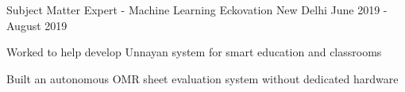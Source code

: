 

\begin{cventries}
\smallskip
  \cventry
    {Subject Matter Expert - Machine Learning} %
    {Eckovation} %
    {New Delhi} %
    {June 2019 - August 2019} %
    {
      \begin{cvitems} %
        \item {Worked to help develop Unnayan system for smart education and classrooms}
        \item {Built an autonomous OMR sheet evaluation system without dedicated hardware}
      \end{cvitems}
    }
\end{cventries}
